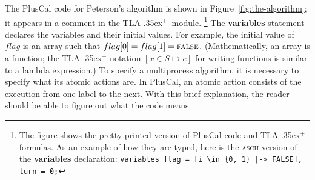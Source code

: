 \documentclass[a4paper]{llncs}
\newcommand{\tlaplus}{\mbox{TLA\kern -.35ex$^+$}\xspace}
\begin{document}
%
The PlusCal code for Peterson's algorithm is shown in
Figure~\ref{fig:the-algorithm}; it appears in a comment in the \tlaplus\ module.%
\footnote{The figure shows the pretty-printed version of PlusCal code
  and \tlaplus formulas.  As an example of how they are typed,
  here is the \textsc{ascii} version of the \textbf{variables}
  declaration:\quad
  \texttt{variables flag = [i \textbackslash in \{0, 1\} |-> FALSE], turn = 0;}
}
The \textbf{variables} statement declares the variables and their initial
values. For example, the initial value of $flag$ is an array such that
$flag[0]=flag[1]=\textsc{false}$. (Mathematically, an array is a function; the
\tlaplus notation $[x \in S \mapsto e]$ for writing functions 
is similar to a lambda expression.)
To specify a multiprocess
algorithm, it is necessary to specify what its atomic actions are.  In
PlusCal, an atomic action consists of the execution from one label to the
next.  With this brief explanation, the reader should be able to
figure out what the code means.
\end{document}

